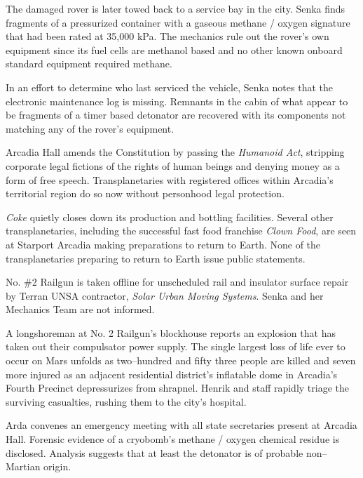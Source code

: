 The damaged rover is later towed back to a service bay in the city. Senka finds fragments of a pressurized container with a gaseous methane / oxygen signature that had been rated at 35,000 kPa. The mechanics rule out the rover's own equipment since its fuel cells are methanol based and no other known onboard standard equipment required methane. 

In an effort to determine who last serviced the vehicle, Senka notes that the electronic maintenance log is missing. Remnants in the cabin of what appear to be fragments of a timer based detonator are recovered with its components not matching any of the rover's equipment.
\StopTimelineDate

Arcadia Hall amends the Constitution by passing the {\it Humanoid Act}, stripping corporate legal fictions of the rights of human beings and denying money as a form of free speech. Transplanetaries with registered offices within Arcadia's territorial region do so now without personhood legal protection.
\StopTimelineDate

{\it Coke} quietly closes down its production and bottling facilities. Several other transplanetaries, including the successful fast food franchise {\it Clown Food}, are seen at Starport Arcadia making preparations to return to Earth. None of the transplanetaries preparing to return to Earth issue public statements.
\StopTimelineDate

No. \#2 Railgun is taken offline for unscheduled rail and insulator surface repair by Terran UNSA contractor, {\it Solar Urban Moving Systems}. Senka and her Mechanics Team are not informed.
\StopTimelineDate

A longshoreman at No. \type{#}2 Railgun's blockhouse reports an explosion that has taken out their compulsator power supply. The single largest loss of life ever to occur on Mars unfolds as two--hundred and fifty three people are killed and seven more injured as an adjacent residential district's inflatable dome in Arcadia's Fourth Precinct depressurizes from shrapnel. Henrik and staff rapidly triage the surviving casualties, rushing them to the city's hospital.

Arda convenes an emergency meeting with all state secretaries present at Arcadia Hall. Forensic evidence of a cryobomb's methane / oxygen chemical residue is disclosed. Analysis suggests that at least the detonator is of probable non--Martian origin. 

